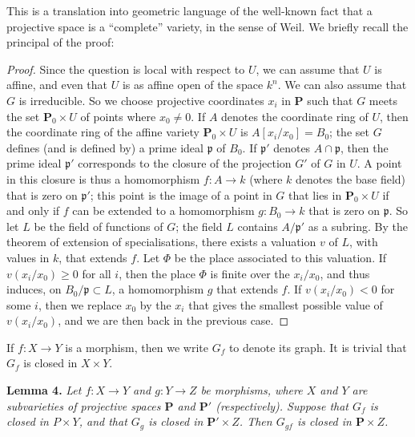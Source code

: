 \documentclass{article}
\newenvironment{itenv}[1]
  {\phantomsection\par\medskip\noindent\textbf{#1.}\itshape}
  {\par\medskip}
\newcommand{\PP}{\mathbf{P}}
\renewcommand{\geq}{\geqslant}
\newcommand{\oldpage}[1]{\marginpar{\footnotesize$\Big\vert$ \textit{p.~#1}}}
\begin{document}
This is a translation into geometric language of the well-known fact that a projective space is a ``complete'' variety, in the sense of Weil.
We briefly recall the principal of the proof:

\begin{proof}
  Since the question is local with respect to $U$, we can assume that $U$ is affine, and even that $U$ is as affine open of the space $k^n$.
  We can also assume that $G$ is irreducible.
  So we choose projective coordinates $x_i$ in $\PP$ such that $G$ meets the set $\PP_0\times U$ of points where $x_0\neq0$.
  If $A$ denotes the coordinate ring of $U$, then the coordinate ring of the affine variety $\PP_0\times U$ is $A[x_i/x_0]=B_0$;
  the set $G$ defines (and is defined by) a prime ideal $\mathfrak{p}$ of $B_0$.
  If $\mathfrak{p}'$ denotes $A\cap\mathfrak{p}$, then the prime ideal $\mathfrak{p}'$ corresponds to the closure of the projection $G'$ of $G$ in $U$.
  A point in this closure is thus a homomorphism $f\colon A\to k$ (where $k$ denotes the base field) that is zero on $\mathfrak{p}'$;
\oldpage{100}
  this point is the image of a point in $G$ that lies in $\PP_0\times U$ if and only if $f$ can be extended to a homomorphism $g\colon B_0\to k$ that is zero on $\mathfrak{p}$.
  So let $L$ be the field of functions of $G$;
  the field $L$ contains $A/\mathfrak{p}'$ as a subring.
  By the theorem of extension of specialisations, there exists a valuation $v$ of $L$, with values in $k$, that extends $f$.
  Let $\Phi$ be the place associated to this valuation.
  If $v(x_i/x_0)\geq0$ for all $i$, then the place $\Phi$ is finite over the $x_i/x_0$, and thus induces, on $B_0/\mathfrak{p}\subset L$, a homomorphism $g$ that extends $f$.
  If $v(x_i/x_0)<0$ for some $i$, then we replace $x_0$ by the $x_i$ that gives the smallest possible value of $v(x_i/x_0)$, and we are then back in the previous case.
\end{proof}

If $f\colon X\to Y$ is a morphism, then we write $G_f$ to denote its graph.
It is trivial that $G_f$ is closed in $X\times Y$.

\begin{itenv}{Lemma 4}
\label{lemma4}
  Let $f\colon X\to Y$ and $g\colon Y\to Z$ be morphisms, where $X$ and $Y$ are subvarieties of projective spaces $\PP$ and $\PP'$ (respectively).
  Suppose that $G_f$ is closed in $P\times Y$, and that $G_g$ is closed in $\PP'\times Z$.
  Then $G_{gf}$ is closed in $\PP\times Z$.
\end{itenv}
\end{document}
